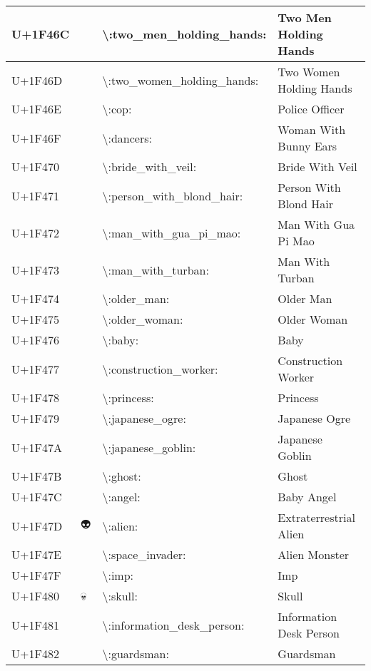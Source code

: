 \begin{table}[h]
\begin{tabulary}{\linewidth}{|L|L|L|L|}
\hline
U+1F46C & 👬 & {\textbackslash}:two\_men\_holding\_hands: & Two Men Holding Hands \\
\hline
U+1F46D & 👭 & {\textbackslash}:two\_women\_holding\_hands: & Two Women Holding Hands \\
\hline
U+1F46E & 👮 & {\textbackslash}:cop: & Police Officer \\
\hline
U+1F46F & 👯 & {\textbackslash}:dancers: & Woman With Bunny Ears \\
\hline
U+1F470 & 👰 & {\textbackslash}:bride\_with\_veil: & Bride With Veil \\
\hline
U+1F471 & 👱 & {\textbackslash}:person\_with\_blond\_hair: & Person With Blond Hair \\
\hline
U+1F472 & 👲 & {\textbackslash}:man\_with\_gua\_pi\_mao: & Man With Gua Pi Mao \\
\hline
U+1F473 & 👳 & {\textbackslash}:man\_with\_turban: & Man With Turban \\
\hline
U+1F474 & 👴 & {\textbackslash}:older\_man: & Older Man \\
\hline
U+1F475 & 👵 & {\textbackslash}:older\_woman: & Older Woman \\
\hline
U+1F476 & 👶 & {\textbackslash}:baby: & Baby \\
\hline
U+1F477 & 👷 & {\textbackslash}:construction\_worker: & Construction Worker \\
\hline
U+1F478 & 👸 & {\textbackslash}:princess: & Princess \\
\hline
U+1F479 & 👹 & {\textbackslash}:japanese\_ogre: & Japanese Ogre \\
\hline
U+1F47A & 👺 & {\textbackslash}:japanese\_goblin: & Japanese Goblin \\
\hline
U+1F47B & 👻 & {\textbackslash}:ghost: & Ghost \\
\hline
U+1F47C & 👼 & {\textbackslash}:angel: & Baby Angel \\
\hline
U+1F47D & 👽 & {\textbackslash}:alien: & Extraterrestrial Alien \\
\hline
U+1F47E & 👾 & {\textbackslash}:space\_invader: & Alien Monster \\
\hline
U+1F47F & 👿 & {\textbackslash}:imp: & Imp \\
\hline
U+1F480 & 💀 & {\textbackslash}:skull: & Skull \\
\hline
U+1F481 & 💁 & {\textbackslash}:information\_desk\_person: & Information Desk Person \\
\hline
U+1F482 & 💂 & {\textbackslash}:guardsman: & Guardsman \\
\hline

\end{tabulary}
\end{table}
